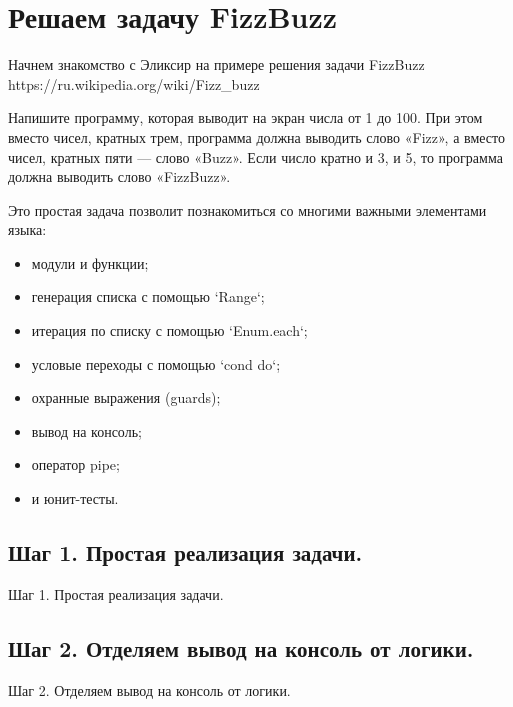 \chapter{Решаем задачу FizzBuzz}

Начнем знакомство с Эликсир на примере решения задачи  FizzBuzz  https://ru.wikipedia.org/wiki/Fizz\_buzz

Напишите программу, которая выводит на экран числа от 1 до 100. При этом вместо чисел, кратных трем, программа должна выводить слово «Fizz», а вместо чисел, кратных пяти — слово «Buzz». Если число кратно и 3, и 5, то программа должна выводить слово «FizzBuzz».

Это простая задача позволит познакомиться со многими важными элементами языка:
\begin{itemize}
\item модули и функции;
\item генерация списка с помощью `Range`;
\item итерация по списку с помощью `Enum.each`;
\item условые переходы с помощью `cond do`;
\item охранные выражения (guards);
\item вывод на консоль;
\item оператор pipe;
\item и юнит-тесты.
\end{itemize}

\section{Шаг 1. Простая реализация задачи.}

Шаг 1. Простая реализация задачи.

\section{Шаг 2. Отделяем вывод на консоль от логики.}

Шаг 2. Отделяем вывод на консоль от логики.
